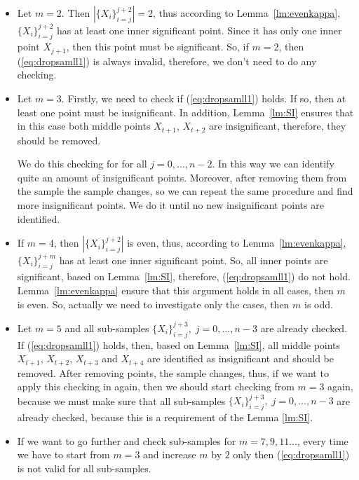\documentclass[12pt, a4paper]{article}
\numberwithin{equation}{section}
\begin{document}
\begin{itemize}

\item 
Let $m=2$. Then $|\{X_{i}\}_{i=j}^{j+2}|=2$, thus according to
Lemma~\ref{lm:evenkappa}, $\{X_{i}\}_{i=j}^{j+2}$ has at least one
inner significant point. 
Since it has only one inner point $X_{j+1}$, then 
this point must be significant. 
So, if $m=2$, then  (\ref{eq:dropsamll1}) is always invalid,
therefore, we don't need to do any checking.

\item 
Let $m=3$. Firstly, we need to check if (\ref{eq:dropsamll1}) holds.
If so,
then at least one 
point must be insignificant.
In addition, Lemma~\ref{lm:SI} ensures that in this case
both middle points $X_{t+1}$, $X_{t+2}$ 
are insignificant, therefore, they should be removed. 

We do this checking for  for all
$j=0,...,n-2$. In this way
we can identify quite an amount of insignificant
points. Moreover, after removing them from the sample the 
sample changes, so we can repeat the same procedure
and find more insignificant points. We do it until
no new insignificant points are 
identified.

\item 
If $m=4$, then $|\{X_{i}\}_{i=j}^{j+2}|$ is even, 
thus, according to Lemma~\ref{lm:evenkappa}, 
$\{X_{i}\}_{i=j}^{j+m}$ has at least one
inner significant point. So, all inner points are significant, 
based on Lemma~\ref{lm:SI}, therefore, 
(\ref{eq:dropsamll1}) do not hold.
Lemma~\ref{lm:evenkappa} ensure
that this argument holds in all cases, then $m$ is even.
So, actually we need to investigate only the cases, then 
$m$ is odd. 

\item 
Let 
$m=5$ and all sub-samples
 $\{X_{i}\}_{i=j}^{j+3},\;j=0,...,n-3$ are already 
 checked.
If (\ref{eq:dropsamll1}) holds, then, based on
Lemma~\ref{lm:SI}, all middle points
$X_{t+1}$, $X_{t+2}$, $X_{t+3}$  and $X_{t+4}$ are  
identified as insignificant and should be removed.
After removing points, the sample changes, thus,
if we want to apply this checking in again,
then we should start checking from $m=3$ again, because
we must make sure that all sub-samples
$\{X_{i}\}_{i=j}^{j+3},\;j=0,...,n-3$ are already 
checked, because this is a requirement of the Lemma \ref{lm:SI}.

\item If we want to go further and check
sub-samples for $m=7,9,11\dots$, every time we have to
start from $m=3$ and increase $m$ by $2$ only then
(\ref{eq:dropsamll1}) is not valid for
all sub-samples.

\end{itemize}
\end{document}

